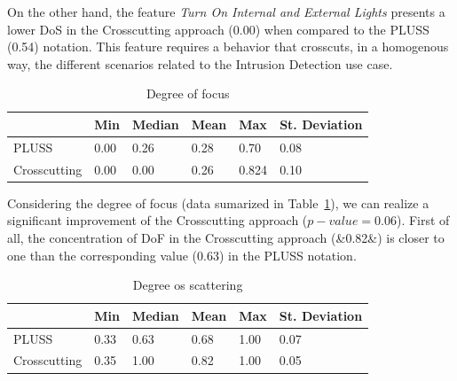 \documentclass{acm_proc_article-sp}
\begin{document}
On the other hand, the feature \emph{Turn On Internal and External Lights}
presents a lower DoS in the Crosscutting approach (0.00) when compared to the
PLUSS (0.54) notation. This feature requires a behavior that crosscuts, in a
homogenous way, the different scenarios related to the Intrusion Detection use
case. 

\begin{table}[htb]
\centering
\caption{Degree of focus}
\label{tab:sh-dof}
\begin{small}
\begin{tabular}{llllll} \hline
					& Min 	& Median 	& Mean 	& Max 	& St. Deviation \\ \hline
	PLUSS			& 0.00  & 0.26   	& 0.28  & 0.70 	& 0.08 			\\
	Crosscutting	& 0.00  & 0.00  	& 0.26 	& 0.824 & 0.10  		\\ \hline	
\end{tabular}
\end{small}
\end{table}

Considering the degree of focus (data sumarized in Table~\ref{tab:sh-dof}), we
can realize a significant improvement of the Crosscutting approach ($p-value=0.06$). First of
all, the concentration of DoF in the Crosscutting approach (&0.82&) is closer to one than
the corresponding value ($0.63$) in the PLUSS notation. 
  
\begin{table}[htb]
\centering
\caption{Degree os scattering}
\label{tab:sh-input}
\begin{small}
\begin{tabular}{llllll} \hline
					& Min 	& Median 	& Mean 	& Max 	& St. Deviation \\ \hline
	PLUSS			& 0.33  & 0.63   	& 0.68  & 1.00 	& 0.07 			\\
	Crosscutting	& 0.35  & 1.00   	& 0.82 	& 1.00 	& 0.05			\\ \hline	
\end{tabular}
\end{small}
\end{table}
 
\end{document}
